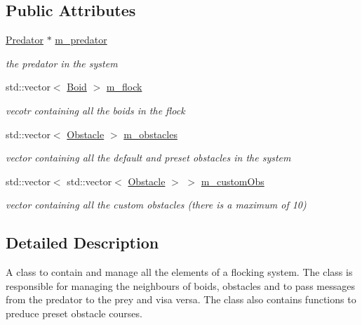 \subsection*{Public Attributes}
\begin{DoxyCompactItemize}
\item 
\hyperlink{classPredator}{Predator} $\ast$ \hyperlink{classWorld_aa117082f4805bdfe15b35a1b36df35e5}{m\_\-predator}
\begin{DoxyCompactList}\small\item\em the predator in the system \item\end{DoxyCompactList}\item 
std::vector$<$ \hyperlink{classBoid}{Boid} $>$ \hyperlink{classWorld_ad2a6ae0d79431a2585aabf1f0d76cea1}{m\_\-flock}
\begin{DoxyCompactList}\small\item\em vecotr containing all the boids in the flock \item\end{DoxyCompactList}\item 
std::vector$<$ \hyperlink{classObstacle}{Obstacle} $>$ \hyperlink{classWorld_aaf8500551c6ba9775986708130e24ec6}{m\_\-obstacles}
\begin{DoxyCompactList}\small\item\em vector containing all the default and preset obstacles in the system \item\end{DoxyCompactList}\item 
std::vector$<$ std::vector$<$ \hyperlink{classObstacle}{Obstacle} $>$ $>$ \hyperlink{classWorld_ab22ebe01284816caec0162158e5ddfdb}{m\_\-customObs}
\begin{DoxyCompactList}\small\item\em vector containing all the custom obstacles (there is a maximum of 10) \item\end{DoxyCompactList}\end{DoxyCompactItemize}


\subsection{Detailed Description}
A class to contain and manage all the elements of a flocking system. The class is responsible for managing the neighbours of boids, obstacles and to pass messages from the predator to the prey and visa versa. The class also contains functions to preduce preset obstacle courses. 

